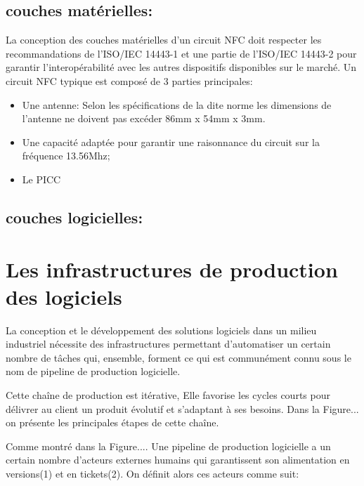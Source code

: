 \documentclass{themeensg}
\begin{document}
\subsection{couches matérielles:}
La conception des couches matérielles d'un circuit NFC doit respecter les recommandations de l'ISO/IEC 14443-1 et une partie de l'ISO/IEC 14443-2 pour garantir l'interopérabilité avec les autres dispositifs disponibles sur le marché. Un circuit NFC typique est composé de 3 parties principales:
\begin{itemize}
\item Une antenne: Selon les spécifications de la dite norme les dimensions de l'antenne ne doivent pas excéder 86mm x 54mm x 3mm.
\item Une capacité adaptée pour garantir une raisonnance du circuit sur la fréquence 13.56Mhz;
\item Le PICC
\end{itemize}
\subsection{couches logicielles:}


\section{Les infrastructures de production des logiciels}
La conception et le développement des solutions logiciels dans un milieu industriel nécessite des infrastructures permettant d'automatiser un certain nombre de tâches qui, ensemble, forment ce qui est communément connu sous le nom de pipeline de production logicielle.

Cette chaîne de production est itérative, Elle favorise les cycles courts pour délivrer au client un produit évolutif et s'adaptant à ses besoins. Dans la Figure... on présente les principales étapes de cette chaîne.

Comme montré dans la Figure.... Une pipeline de production logicielle a un certain nombre d'acteurs externes humains qui garantissent son alimentation en versions(1) et en tickets(2). On définit alors ces acteurs comme suit:
\end{document}

